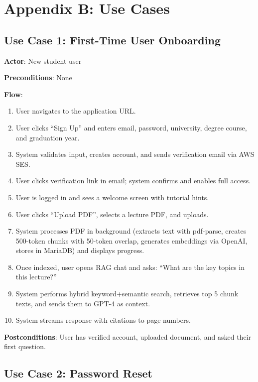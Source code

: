 \documentclass[12pt,a4paper]{article}
\begin{document}
\section*{Appendix B: Use Cases}

\subsection*{Use Case 1: First-Time User Onboarding}

\textbf{Actor}: New student user

\textbf{Preconditions}: None

\textbf{Flow}:
\begin{enumerate}
    \item User navigates to the application URL.
    \item User clicks ``Sign Up'' and enters email, password, university, degree course, and graduation year.
    \item System validates input, creates account, and sends verification email via AWS SES.
    \item User clicks verification link in email; system confirms and enables full access.
    \item User is logged in and sees a welcome screen with tutorial hints.
    \item User clicks ``Upload PDF'', selects a lecture PDF, and uploads.
    \item System processes PDF in background (extracts text with pdf-parse, creates 500-token chunks with 50-token overlap, generates embeddings via OpenAI, stores in MariaDB) and displays progress.
    \item Once indexed, user opens RAG chat and asks: ``What are the key topics in this lecture?''
    \item System performs hybrid keyword+semantic search, retrieves top 5 chunk texts, and sends them to GPT-4 as context.
    \item System streams response with citations to page numbers.
\end{enumerate}

\textbf{Postconditions}: User has verified account, uploaded document, and asked their first question.

\subsection*{Use Case 2: Password Reset}
\end{document}

